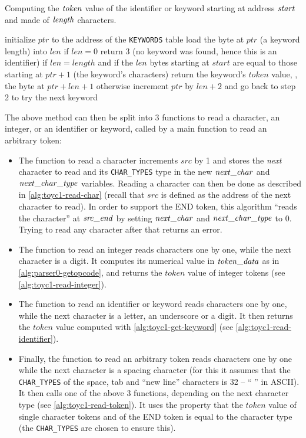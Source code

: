 \begin{Algorithm}
\caption{Computing the $\it{token}$ value of the identifier or keyword starting
at address $\it{start}$ and made of $\it{length}$
characters.}\label{alg:toyc1-get-keyword}
\begin{algorithmic}[1]
\State initialize $ptr$ to the address of the {\tt KEYWORDS} table
\State load the byte at $ptr$ (a keyword length) into $len$
\State if $len=0$ return 3 (no keyword was found, hence this is an identifier)
\Begin if $len=length$ and if the $len$ bytes starting at $start$
are equal to those starting at $ptr+1$ (the keyword's characters)
  \State return the keyword's $token$ value, \ie, the byte at $ptr+len+1$
\Continue otherwise
\State increment $ptr$ by $len+2$ and go back to step 2 to try the next keyword
\End
\end{algorithmic}
\end{Algorithm}

The above method can then be split into 3 functions to read a character, an
integer, or an identifier or keyword, called by a main function to read an
arbitrary token:
\begin{itemize}
  \item The function to read a character increments $src$ by 1 and stores the
  {\em next} character to read and its {\tt CHAR\_TYPES} type in the new
  $\it{next\_char}$ and $\it{next\_char\_type}$ variables. Reading a character
  can then be done as described in \cref{alg:toyc1-read-char} (recall that
  $src$ is defined as the address of the next character to read). In order to
  support the END token, this algorithm ``reads the character'' at
  $\it{src\_end}$ by setting $\it{next\_char}$ and $\it{next\_char\_type}$ to
  0. Trying to read any character after that returns an error.

  \item The function to read an integer reads characters one by one, while the
  next character is a digit. It computes its numerical value in
  $\it{token\_data}$ as in \cref{alg:parser0-getopcode}, and returns the
  $token$ value of integer tokens (see \cref{alg:toyc1-read-integer}).

  \item The function to read an identifier or keyword reads characters one by
  one, while the next character is a letter, an underscore or a digit. It then
  returns the $token$ value computed with \cref{alg:toyc1-get-keyword} (see
  \cref{alg:toyc1-read-identifier}).

  \item Finally, the function to read an arbitrary token reads characters one
  by one while the next character is a spacing character (for this it assumes
  that the {\tt CHAR\_TYPES} of the space, tab and ``new line'' characters is
  32 -- `` '' in ASCII). It then calls one of the above 3 functions, depending
  on the next character type (see \cref{alg:toyc1-read-token}). It uses the
  property that the $token$ value of single character tokens and of the END
  token is equal to the character type (the {\tt CHAR\_TYPES} are chosen to
  ensure this).
\end{itemize}

